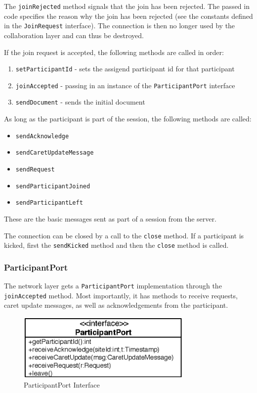 The \texttt{join\-Rejected} method signals that the join has been rejected. 
The passed in code specifies the reason why the join has been rejected 
(see the constants defined in the \texttt{Join\-Request} interface).
The connection is then no longer used by the collaboration layer and can thus
be destroyed.

If the join request is accepted, the following methods are called in order:
\begin{enumerate}
 \item \texttt{setParticipantId} - sets the assigend participant id for that participant
 \item \texttt{joinAccepted} - passing in an instance of the \texttt{ParticipantPort} interface
 \item \texttt{sendDocument} - sends the initial document
\end{enumerate} 

As long as the participant is part of the session, the following methods
are called:
\begin{itemize}
 \item \texttt{sendAcknowledge} 
 \item \texttt{sendCaretUpdateMessage}
 \item \texttt{sendRequest}
 \item \texttt{sendParticipantJoined}
 \item \texttt{sendParticipantLeft}
\end{itemize}

These are the basic messages sent as part of a session from the server.

The connection can be closed by a call to the \texttt{close} method. If a 
participant is kicked, first the \texttt{send\-Kicked} method and then the
\texttt{close} method is called.


\subsubsection{ParticipantPort}
The network layer gets a \texttt{Participant\-Port} implementation through
the \texttt{join\-Accepted} method. Most importantly, it has methods to receive
requests, caret update messages, as well as acknowledgements from the 
participant.

\begin{figure}[H]
 \centering
 \includegraphics[width=8.50cm,height=3.25cm]{../images/finalreport/architecture_participantport_uml.eps}
 \caption{ParticipantPort Interface}
\end{figure}

